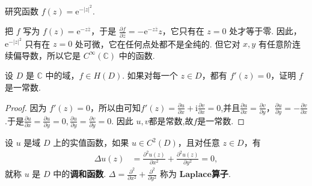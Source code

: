 \documentclass[../../main.tex]{subfiles}
\begin{document}
\begin{example}
研究函数 $f(z) = \mathrm{e}^{-\vert z \vert^2}$.
\end{example}
\begin{solution}
把 $f$ 写为 $f(z) = \mathrm{e}^{-z\overline{z}}$，于是 $\frac{\partial f}{\partial \overline{z}} = -\mathrm{e}^{-z\overline{z}}z$，它只有在 $z = 0$ 处才等于零. 因此，$\mathrm{e}^{-\vert z \vert^2}$ 只有在 $z = 0$ 处可微，它在任何点处都不是全纯的. 但它对 $x, y$ 有任意阶连续偏导数，所以它是 $C^\infty(\mathbb{C})$ 中的函数.
\end{solution}

\begin{proposition}\label{proposition:复变函数导数为0必是常函数}
设 \( D \) 是 \( \mathbb{C} \) 中的域，\( f \in H(D) \). 如果对每一个 \( z \in D \)，都有 \( f'(z) = 0 \)，证明 \( f \) 是一常数.
\end{proposition}
\begin{proof}
因为 \( f'(z) = 0 \)，所以由可知\( f'(z) = \frac{\partial u}{\partial x} + \mathrm{i}\frac{\partial v}{\partial x} = 0 \),并且\( \frac{\partial u}{\partial x} = \frac{\partial v}{\partial y} \)，\( \frac{\partial u}{\partial y} = -\frac{\partial v}{\partial x} \).于是$\frac{\partial u}{\partial x}=\frac{\partial u}{\partial y}=0,\frac{\partial u}{\partial y}=\frac{\partial v}{\partial y}=0$.
因此 \( u,v \)都是常数,故$f$是一常数.
\end{proof}

\begin{definition}[调和函数]
设 $u$ 是域 $D$ 上的实值函数，如果 $u \in C^2(D)$，且对任意 $z \in D$，有
\begin{align}
\Delta u(z) &= \frac{\partial^2 u(z)}{\partial x^2} + \frac{\partial^2 u(z)}{\partial y^2} = 0, \label{eq:2.2.7}
\end{align}
就称 $u$ 是 $D$ 中的\textbf{调和函数}. $\Delta = \frac{\partial^2}{\partial x^2} + \frac{\partial^2}{\partial y^2}$ 称为 $\mathbf{Laplace}$\textbf{算子}.
\end{definition}
\end{document}
